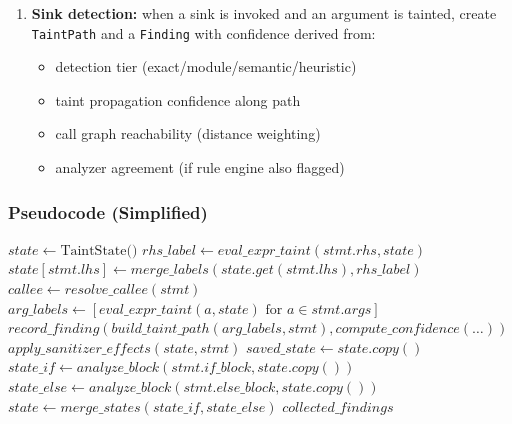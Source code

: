 \begin{enumerate}
    Label confidence becomes maximum or a defined fusion function.

    \item \textbf{Sink detection:} when a sink is invoked and an argument is tainted, create \texttt{TaintPath} and a \texttt{Finding} with confidence derived from:
    \begin{itemize}
        \item detection tier (exact/module/semantic/heuristic)
        \item taint propagation confidence along path
        \item call graph reachability (distance weighting)
        \item analyzer agreement (if rule engine also flagged)
    \end{itemize}
\end{enumerate}

\subsubsection{Pseudocode (Simplified)}

\begin{algorithm}[H]
\caption{Intraprocedural Taint Analysis Algorithm}
\label{alg:taint_algo}
\begin{algorithmic}[1]
    \State $state \gets \text{TaintState()}$
            \State $rhs\_label \gets eval\_expr\_taint(stmt.rhs, state)$
            \State $state[stmt.lhs] \gets merge\_labels(state.get(stmt.lhs), rhs\_label)$
            \State $callee \gets resolve\_callee(stmt)$
            \State $arg\_labels \gets [eval\_expr\_taint(a, state) \text{ for } a \in stmt.args]$
                \State $record\_finding(build\_taint\_path(arg\_labels, stmt), compute\_confidence(\dots))$
            \EndIf
                \State $apply\_sanitizer\_effects(state, stmt)$
            \EndIf
            \State $saved\_state \gets state.copy()$
            \State $state\_if \gets analyze\_block(stmt.if\_block, state.copy())$
            \State $state\_else \gets analyze\_block(stmt.else\_block, state.copy())$
            \State $state \gets merge\_states(state\_if, state\_else)$
        \EndIf
    \EndFor
    \State \Return $collected\_findings$
\EndFunction
\end{algorithmic}
\end{algorithm}

